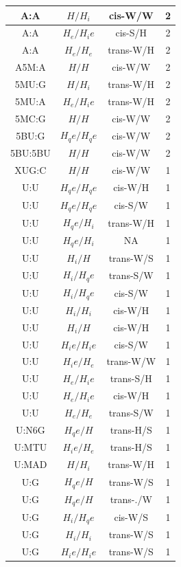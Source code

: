 \begin{center}
\begin{longtable}{c|c|c|c}
A:A & $H/H_i$ & cis-W/W & 2 \\  \hline
A:A & $H_e/H_ie$ & cis-S/H & 2 \\  \hline
A:A & $H_e/H_e$ & trans-W/H & 2 \\  \hline
A5M:A & $H/H$ & cis-W/W & 2 \\  \hline
5MU:G & $H/H_i$ & trans-W/H & 2 \\  \hline
5MU:A & $H_e/H_ie$ & trans-W/H & 2 \\  \hline
5MC:G & $H/H$ & cis-W/W & 2 \\  \hline
5BU:G & $H_qe/H_qe$ & cis-W/W & 2 \\  \hline
5BU:5BU & $H/H$ & cis-W/W & 2 \\  \hline
XUG:C & $H/H$ & cis-W/W & 1 \\  \hline
U:U & $H_qe/H_qe$ & cis-W/H & 1 \\  \hline
U:U & $H_qe/H_qe$ & cis-S/W & 1 \\  \hline
U:U & $H_qe/H_i$ & trans-W/H & 1 \\  \hline
U:U & $H_qe/H_i$ & NA & 1 \\  \hline
U:U & $H_i/H$ & trans-W/S & 1 \\  \hline
U:U & $H_i/H_qe$ & trans-S/W & 1 \\  \hline
U:U & $H_i/H_qe$ & cis-S/W & 1 \\  \hline
U:U & $H_i/H_i$ & cis-W/H & 1 \\  \hline
U:U & $H_i/H$ & cis-W/H & 1 \\  \hline
U:U & $H_ie/H_ie$ & cis-S/W & 1 \\  \hline
U:U & $H_ie/H_e$ & trans-W/W & 1 \\  \hline
U:U & $H_e/H_ie$ & trans-S/H & 1 \\  \hline
U:U & $H_e/H_ie$ & cis-W/H & 1 \\  \hline
U:U & $H_e/H_e$ & trans-S/W & 1 \\  \hline
U:N6G & $H_qe/H$ & trans-H/S & 1 \\  \hline
U:MTU & $H_ie/H_e$ & trans-H/S & 1 \\  \hline
U:MAD & $H/H_i$ & trans-W/H & 1 \\  \hline
U:G & $H_qe/H$ & trans-W/S & 1 \\  \hline
U:G & $H_qe/H$ & trans-./W & 1 \\  \hline
U:G & $H_i/H_qe$ & cis-W/S & 1 \\  \hline
U:G & $H_i/H_i$ & trans-W/S & 1 \\  \hline
U:G & $H_ie/H_ie$ & trans-W/S & 1 \\  \hline

\end{longtable}
\end{center}

